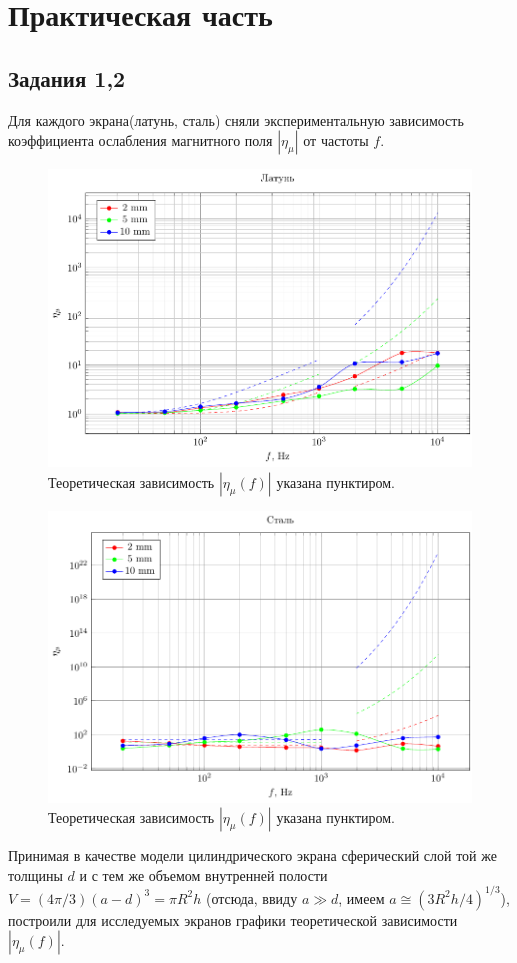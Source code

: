 \section{Практическая часть}
\subsection{Задания 1,2}
Для каждого экрана(латунь, сталь) сняли экспериментальную зависимость коэффициента ослабления магнитного поля $|\eta_{\mu}|$ от частоты $f$.
\begin{figure}[H]
	\vspace{-15pt}
	\centering
	\includegraphics[scale=1]{plots/Lat.pdf}
	\caption{Теоретическая зависимость $|\eta_{\mu}(f)|$ указана пунктиром.}
	\label{fig:figure2}
	\vspace{-20pt}
\end{figure}
\begin{figure}[H]
	\vspace{-10pt}
	\centering
	\includegraphics[scale=1]{plots/Steel.pdf}
	\caption{Теоретическая зависимость $|\eta_{\mu}(f)|$ указана пунктиром.}
	\label{fig:figure3}
	\vspace{-10pt}
\end{figure}
Принимая в качестве модели цилиндрического экрана сферический слой той же толщины $d$ и с тем же объемом внутренней полости $V=(4\pi/3)(a-d)^3=\pi R^2h$ (отсюда, ввиду $a\gg d$, имеем $a\cong (3R^2h/4)^{1/3}$), построили для исследуемых экранов графики теоретической зависимости $|\eta_{\mu}(f)|$.

